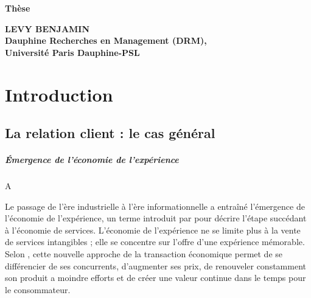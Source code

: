 \documentclass[a4paper,12pt]{report}
\begin{document}
\begin{titlepage}
\vspace*{3cm}

\begin{center}
\LARGE{\textbf{Thèse}}
\end{center}

\vspace{3cm}

\begin{center}
\hspace{3cm}
\textbf{LEVY BENJAMIN %
} \hspace*{3cm} \\ \medskip
     \textbf{Dauphine Recherches en Management  (DRM),\\
      Université Paris Dauphine-PSL
}
\end{center}

\vspace{1cm}
\end{titlepage}

{
  \setlength{\parskip}{0pt}
  \setlength{\parindent}{15pt}
  \tableofcontents
}

\chapter{Introduction}

\section{La relation client : le cas général}

\paragraph{Émergence de l'économie de l'expérience} A

Le passage de l'ère industrielle à l'ère informationnelle a entraîné l'émergence de l'économie de l'expérience, un terme introduit par \textcite{pine99} pour décrire l'étape succédant à l'économie de services. L'économie de l'expérience ne se limite plus à la vente de services intangibles ; elle se concentre sur l'offre d'une expérience mémorable. Selon \textcite{pine99}, cette nouvelle approche de la transaction économique permet de se différencier de ses concurrents, d'augmenter ses prix, de renouveler constamment son produit a moindre efforts et de créer une valeur continue dans le temps pour le consommateur. \par 
\end{document}
